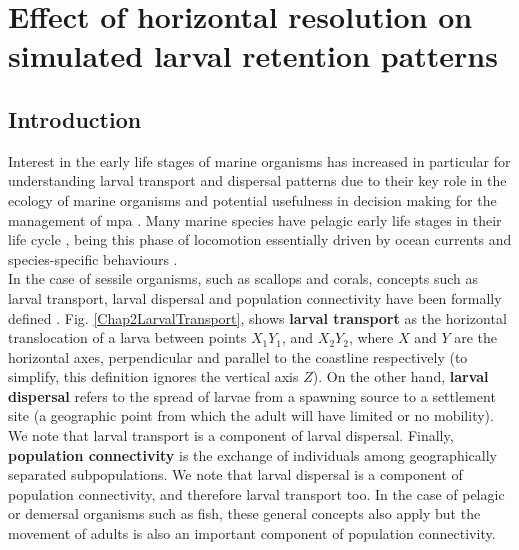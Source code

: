 \chapter{Effect of horizontal resolution on simulated larval retention patterns}\label{Chap2}

\clearpage
\section{Introduction}\label{Chap2Intro}

Interest in the early life stages of marine organisms has increased \citep{Stra1993,Haven1995,Levi2006,GawaMoni2007,CoweSpon2009} in particular for understanding larval transport and dispersal patterns \citep{Youn1995,GreeMayp2015,Leis2021} due to their key role in the ecology of marine organisms \citep{MoseSmit1993} and potential usefulness in decision making for the management of \acrfull{mpa} \citep{DaloBogd2015}. Many marine species have pelagic early life stages in their life cycle \citep{Haven1995}, being this phase of locomotion essentially driven by ocean currents and species-specific behaviours \citep{Levi1990,CowePari2006,DaloBogd2015}.\\

In the case of sessile organisms, such as scallops and corals, concepts such as larval transport, larval dispersal and population connectivity have been formally defined \citep{PineHare2007}. Fig. \ref{Chap2LarvalTransport}, shows \textbf{larval transport} as the horizontal translocation of a larva between points $X_{1}Y_{1}$, and $X_{2}Y_{2}$, where $X$ and $Y$ are the horizontal axes, perpendicular and parallel to the coastline respectively (to simplify, this definition ignores the vertical axis $Z$). On the other hand, \textbf{larval dispersal} refers to the spread of larvae from a spawning source to a settlement site (a geographic point from which the adult will have limited or no mobility). We note that larval transport is a component of larval dispersal. Finally, \textbf{population connectivity} is the exchange of individuals among geographically separated subpopulations. We note that larval dispersal is a component of population connectivity, and therefore larval transport too. In the case of pelagic or demersal organisms such as fish, these general concepts also apply but the movement of adults is also an important component of population connectivity.\\

